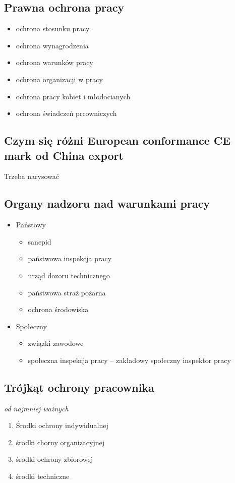 \documentclass[11pt]{article}
\begin{document}
\subsection{Prawna ochrona pracy}
\label{sec:orgf1a6436}
\begin{itemize}
\item ochrona stosunku pracy
\item ochrona wynagrodzenia
\item ochrona warunków pracy
\item ochrona organizacji w pracy
\item ochrona pracy kobiet i młodocianych
\item ochrona świadczeń prcowniczych
\end{itemize}
\subsection{Czym się różni European conformance CE mark od China export}
\label{sec:org32f2c6e}
Trzeba narysować
\subsection{Organy nadzoru nad warunkami pracy}
\label{sec:org7067a56}
\begin{itemize}
\item Państowy
\begin{itemize}
\item sanepid
\item państwowa inspekcja pracy
\item urząd dozoru technicznego
\item państwowa straż pożarna
\item ochrona środowiska
\end{itemize}
\item Społeczny
\begin{itemize}
\item związki zawodowe
\item społeczna inspekcja pracy -- zakładowy społeczny inspektor pracy
\end{itemize}
\end{itemize}
\subsection{Trójkąt ochrony pracownika}
\label{sec:orgce1aed8}
\emph{od najmniej ważnych}
\begin{enumerate}
\item Środki ochrony indywidualnej
\item środki chorny organizacyjnej
\item środki ochrony zbiorowej
\item środki techniczne
\end{enumerate}
\end{document}
